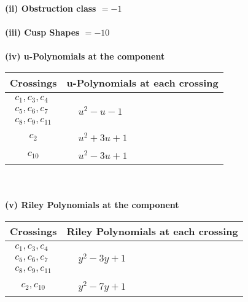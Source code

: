 \documentclass[1p]{elsarticle_modified}
\theoremstyle{definition}
\begin{document}
\flushleft \textbf{(ii) Obstruction class $= -1$}\\~\\
\flushleft \textbf{(iii) Cusp Shapes $= -10$}\\~\\
\newpage\renewcommand{\arraystretch}{1}
\flushleft \textbf{(iv) u-Polynomials at the component}\newline \\
\begin{tabular}{m{50pt}|m{274pt}}
Crossings & \hspace{64pt}u-Polynomials at each crossing \\
\hline $$\begin{aligned}c_{1},c_{3},c_{4}\\c_{5},c_{6},c_{7}\\c_{8},c_{9},c_{11}\end{aligned}$$&$\begin{aligned}
&u^2- u-1
\end{aligned}$\\
\hline $$\begin{aligned}c_{2}\end{aligned}$$&$\begin{aligned}
&u^2+3 u+1
\end{aligned}$\\
\hline $$\begin{aligned}c_{10}\end{aligned}$$&$\begin{aligned}
&u^2-3 u+1
\end{aligned}$\\
\hline
\end{tabular}\\~\\
\newpage\renewcommand{\arraystretch}{1}
\flushleft \textbf{(v) Riley Polynomials at the component}\newline \\
\begin{tabular}{m{50pt}|m{274pt}}
Crossings & \hspace{64pt}Riley Polynomials at each crossing \\
\hline $$\begin{aligned}c_{1},c_{3},c_{4}\\c_{5},c_{6},c_{7}\\c_{8},c_{9},c_{11}\end{aligned}$$&$\begin{aligned}
&y^2-3 y+1
\end{aligned}$\\
\hline $$\begin{aligned}c_{2},c_{10}\end{aligned}$$&$\begin{aligned}
&y^2-7 y+1
\end{aligned}$\\
\hline
\end{tabular}\\~\\
\end{document}
